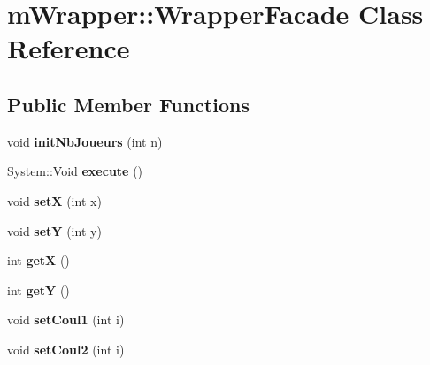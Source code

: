 \hypertarget{classm_wrapper_1_1_wrapper_facade}{
\section{mWrapper::WrapperFacade Class Reference}
\label{classm_wrapper_1_1_wrapper_facade}
}
\subsection*{Public Member Functions}
\begin{DoxyCompactItemize}
\item 
\hypertarget{classm_wrapper_1_1_wrapper_facade_a3d63e977b884ff2bd6e21bd962ae2820}{
void {\bfseries initNbJoueurs} (int n)}
\label{classm_wrapper_1_1_wrapper_facade_a3d63e977b884ff2bd6e21bd962ae2820}

\item 
\hypertarget{classm_wrapper_1_1_wrapper_facade_a86bba685c88561d5a5525281b91b40bd}{
System::Void {\bfseries execute} ()}
\label{classm_wrapper_1_1_wrapper_facade_a86bba685c88561d5a5525281b91b40bd}

\item 
\hypertarget{classm_wrapper_1_1_wrapper_facade_a7609452c1a5f18bb1aa6db9dd7b0eff2}{
void {\bfseries setX} (int x)}
\label{classm_wrapper_1_1_wrapper_facade_a7609452c1a5f18bb1aa6db9dd7b0eff2}

\item 
\hypertarget{classm_wrapper_1_1_wrapper_facade_ab9dbf06945cede94b0f97e1e28478971}{
void {\bfseries setY} (int y)}
\label{classm_wrapper_1_1_wrapper_facade_ab9dbf06945cede94b0f97e1e28478971}

\item 
\hypertarget{classm_wrapper_1_1_wrapper_facade_a7c05f149b546f964428f4ebdb129b592}{
int {\bfseries getX} ()}
\label{classm_wrapper_1_1_wrapper_facade_a7c05f149b546f964428f4ebdb129b592}

\item 
\hypertarget{classm_wrapper_1_1_wrapper_facade_a516d6db44f54d4802584480f84e07456}{
int {\bfseries getY} ()}
\label{classm_wrapper_1_1_wrapper_facade_a516d6db44f54d4802584480f84e07456}

\item 
\hypertarget{classm_wrapper_1_1_wrapper_facade_acf70217707d16246a4fad70b03cca228}{
void {\bfseries setCoul1} (int i)}
\label{classm_wrapper_1_1_wrapper_facade_acf70217707d16246a4fad70b03cca228}

\item 
\hypertarget{classm_wrapper_1_1_wrapper_facade_a3aecd5e45cd9f04400f7207e6245a915}{
void {\bfseries setCoul2} (int i)}
\label{classm_wrapper_1_1_wrapper_facade_a3aecd5e45cd9f04400f7207e6245a915}


\end{DoxyCompactItemize}
